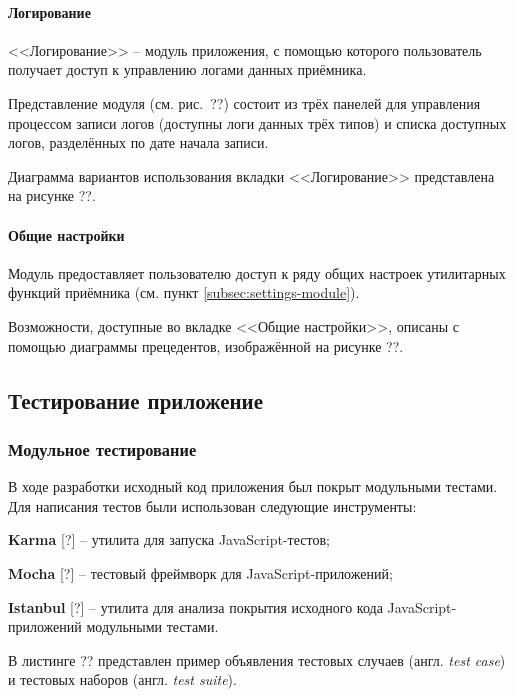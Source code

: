 \paragraph{Логирование}

<<Логирование>> -- модуль приложения, с помощью которого пользователь получает доступ к управлению логами данных приёмника.

Представление модуля (см. рис.~??) состоит из трёх панелей для управления процессом записи логов (доступны логи данных трёх типов) и списка доступных логов, разделённых по дате начала записи.

Диаграмма вариантов использования вкладки <<Логирование>> представлена на рисунке ??.

\paragraph{Общие настройки}

Модуль предоставляет пользователю доступ к ряду общих настроек  утилитарных функций приёмника (см. пункт \ref{subsec:settings-module}).

Возможности, доступные во вкладке <<Общие настройки>>, описаны с помощью диаграммы прецедентов, изображённой на рисунке ??.



\subsection{Тестирование приложение}


\subsubsection{Модульное тестирование}

В ходе разработки исходный код приложения был покрыт модульными тестами. Для написания тестов были использован следующие инструменты:
\begin{dashitemize}
  \item \textbf{Karma} [?] -- утилита для запуска JavaScript-тестов;
  \item \textbf{Mocha} [?] -- тестовый фреймворк для JavaScript-приложений;
  \item \textbf{Istanbul} [?] -- утилита для анализа покрытия исходного кода JavaScript-приложений модульными тестами.
\end{dashitemize}

В листинге ?? представлен пример объявления тестовых случаев (англ. \emph{test case}) и тестовых наборов (англ. \emph{test suite}).

